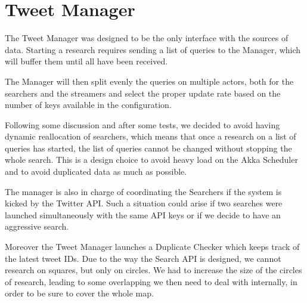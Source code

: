 \section{Tweet Manager}

The Tweet Manager was designed to be the only interface with the sources of data. Starting a research requires sending a list of queries to the Manager, which will buffer them until all have been received.

The Manager will then split evenly the queries on multiple actors, both for the searchers and the streamers and select the proper update rate based on the number of keys available in the configuration.

Following some discussion and after some tests, we decided to avoid having dynamic reallocation of searchers, which means that once a research on a list of queries has started, the list of queries cannot be changed without stopping the whole search. This is a design choice to avoid heavy load on the Akka Scheduler and to avoid duplicated data as much as possible.

The manager is also in charge of coordinating the Searchers if the system is kicked by the Twitter API. Such a situation could arise if two searches were launched simultaneously with the same API keys or if we decide to have an aggressive search.

Moreover the Tweet Manager launches a Duplicate Checker which keeps track of the latest tweet IDs. Due to the way the Search API is designed, we cannot research on squares, but only on circles. We had to increase the size of the circles of research, leading to some overlapping we then need to deal with internally, in order to be sure to cover the whole map.

